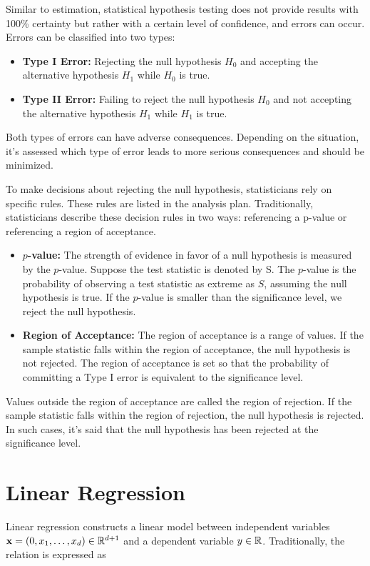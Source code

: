 Similar to estimation, statistical hypothesis testing does not provide results with 100\% certainty but rather with a certain level of confidence, and errors can occur. Errors can be classified into two types:

\begin{itemize}
 \item \textbf{Type I Error:} Rejecting the null hypothesis $H_0$
       and accepting the alternative hypothesis $H_1$ while $H_0$ is true.
 \item \textbf{Type II Error:} Failing to reject the null hypothesis $H_0$ and not accepting the alternative hypothesis $H_1$ while $H_1$ is true.
\end{itemize}

Both types of errors can have adverse consequences. Depending on the situation, it's assessed which type of error leads to more serious consequences and should be minimized.

To make decisions about rejecting the null hypothesis, statisticians rely on specific rules. These rules are listed in the analysis plan. Traditionally, statisticians describe these decision rules in two ways: referencing a p-value or referencing a region of acceptance.

\begin{itemize}
 \item \textbf{$p$-value:} The strength of evidence in favor of a null hypothesis is measured by the $p$-value. Suppose the test statistic is denoted by S. The $p$-value is the probability of observing a test statistic as extreme as $S$, assuming the null hypothesis is true. If the $p$-value is smaller than the significance level, we reject the null hypothesis.
 \item \textbf{Region of Acceptance:} The region of acceptance is a range of values. If the sample statistic falls within the region of acceptance, the null hypothesis is not rejected. The region of acceptance is set so that the probability of committing a Type I error is equivalent to the significance level.
\end{itemize}

Values outside the region of acceptance are called the region of rejection. If the sample statistic falls within the region of rejection, the null hypothesis is rejected. In such cases, it's said that the null hypothesis has been rejected at the  significance level.

\section{Linear Regression}
Linear regression constructs a linear model between independent variables $\mathbf{x}=(0, x_1,\ldots, x_d)\in\mathbb{R}^{d+1}$ and a dependent variable $y\in\mathbb{R}$. Traditionally, the relation is expressed as

